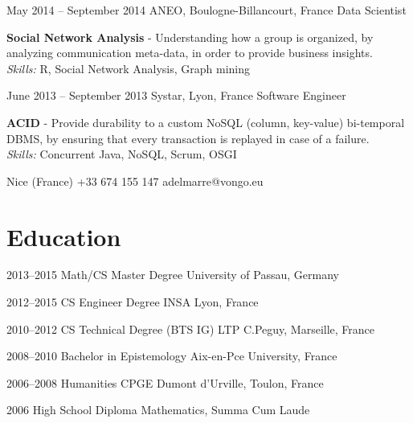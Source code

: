 \documentclass{tccv}
\renewcommand{\it}{\textit}
\renewcommand{\bf}{\textbf}
\begin{document}
\begin{eventlist}
\item{May 2014 -- September 2014}
    {ANEO, Boulogne-Billancourt, France}
    {Data Scientist}

\bf{Social Network Analysis} - Understanding how a group is organized, by analyzing communication meta-data, in order to provide business insights.\\
\it{Skills:} R, Social Network Analysis, Graph mining

\item{June 2013 -- September 2013}
    {Systar, Lyon, France}
    {Software Engineer}

\bf{ACID} - Provide durability to a custom NoSQL (column, key-value) bi-temporal DBMS, by ensuring that every transaction is replayed in case of a failure.\\
\it{Skills:} Concurrent Java, NoSQL, Scrum, OSGI



\end{eventlist}

\personal
    {Nice (France)}
    {+33 674 155 147}
    {adelmarre@vongo.eu}

\section{Education}

\begin{yearlist}

\item{2013--2015}
     {Math/CS Master Degree}
     {University of Passau, Germany}

\item{2012--2015}
     {CS Engineer Degree}
     {INSA Lyon, France}

\item{2010--2012}
     {CS Technical Degree (BTS IG)}
     {LTP C.Peguy, Marseille, France}

\item{2008--2010}
     {Bachelor in Epistemology}
     {Aix-en-Pce University, France}

\item{2006--2008}
     {Humanities CPGE}
     {Dumont d'Urville, Toulon, France}

\item{2006}
     {High School Diploma}
     {Mathematics, Summa Cum Laude}

\end{yearlist}
\end{document}
